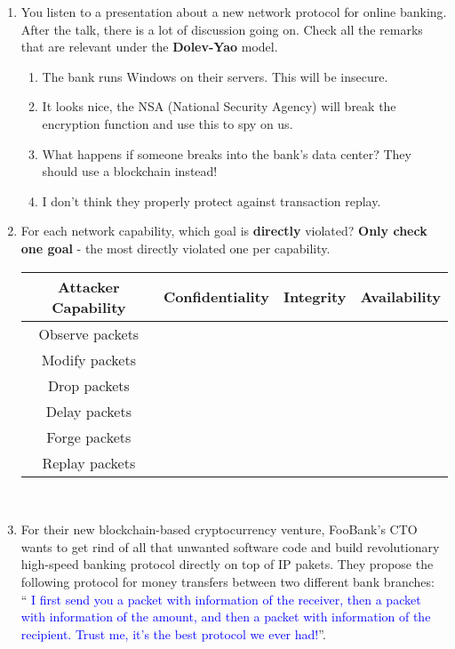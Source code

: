 \documentclass{article} %
\newcommand{\incorrectOption}{\textbf{\Circle}}
\begin{document}
\begin{enumerate}[leftmargin=*, label=\textbf{Q\arabic*}, itemsep=-5pt]
\item You listen to a presentation about a new network protocol for
  online banking. After the talk, there is a lot of discussion going
  on. Check all the remarks that are relevant under the \textbf{Dolev-Yao} model.  
  \begin{enumerate}[itemsep=-3.5pt, label={}]
   \item[\incorrectOption] The bank runs Windows on their servers. This will
    be insecure.
   \item[\incorrectOption] It looks nice, the NSA (National Security Agency)
    will break the encryption function and use this to spy on us.
    \item[\incorrectOption] What happens if someone breaks into the bank's
    data center? They should use a blockchain instead!
    \item[\incorrectOption] I don't think they properly protect against
    transaction replay.
   \end{enumerate}   
\item For each network capability, which goal is {\bf{}directly}
  violated? {\bf{}Only check one goal} - the most directly violated
  one per capability.

  \begin{tabular}{|c|c|c|c|} \hline
     \textbf{Attacker Capability} & \textbf{Confidentiality} & \textbf{Integrity} & \textbf{Availability}\\ \hline
     Observe packets & \incorrectOption & \incorrectOption & \incorrectOption\\ \hline
     Modify packets & \incorrectOption & \incorrectOption & \incorrectOption\\ \hline
     Drop packets & \incorrectOption & \incorrectOption & \incorrectOption\\ \hline
     Delay packets & \incorrectOption & \incorrectOption & \incorrectOption\\ \hline
     Forge packets & \incorrectOption & \incorrectOption & \incorrectOption\\ \hline
     Replay packets & \incorrectOption & \incorrectOption & \incorrectOption\\\hline
  \end{tabular}  \\
\item For their new blockchain-based  cryptocurrency venture,
  FooBank's CTO wants to get rind of all that unwanted software code
  and build revolutionary high-speed banking protocol directly on top
  of IP pakets. They propose the following protocol for money
  transfers between two different bank branches: \\
  ``\textcolor{blue}{ I first send you a packet with information of the receiver,
  then a packet with information of the amount, and then a
  packet with information of the recipient. Trust me, it's the
  best protocol we ever had!}''.


\end{enumerate}
\end{document}
